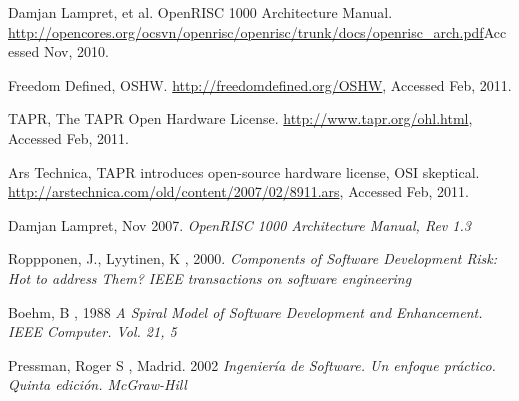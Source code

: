 \documentclass[a4paper,12pt]{report}
\begin{document}
\begin{thebibliography}{99}
 Damjan Lampret, et al. OpenRISC 1000 Architecture Manual.
\url{http://opencores.org/ocsvn/openrisc/openrisc/trunk/docs/openrisc_arch.pdf}Accessed Nov, 2010.

Freedom Defined, OSHW.
\url{ http://freedomdefined.org/OSHW}, Accessed Feb, 2011.

TAPR, The TAPR Open Hardware License. \url{http://www.tapr.org/ohl.html}, Accessed Feb, 2011.

Ars Technica, TAPR introduces open-source hardware license, OSI skeptical.
\url{http://arstechnica.com/old/content/2007/02/8911.ars}, Accessed Feb, 2011.


 Damjan Lampret, Nov 2007.
  \textit{OpenRISC 1000 Architecture Manual, Rev 1.3}

 Roppponen, J., Lyytinen, K , 2000. 
\textit{Components of Software Development Risk: Hot to address Them? IEEE transactions on software
engineering}

 Boehm, B , 1988  
\textit{A Spiral Model of Software Development and Enhancement. IEEE Computer. Vol. 21, 5} 

 Pressman, Roger S , Madrid. 2002
\textit{Ingeniería de Software. Un enfoque práctico. Quinta edición. McGraw-Hill} 


\end{thebibliography}
\end{document}

